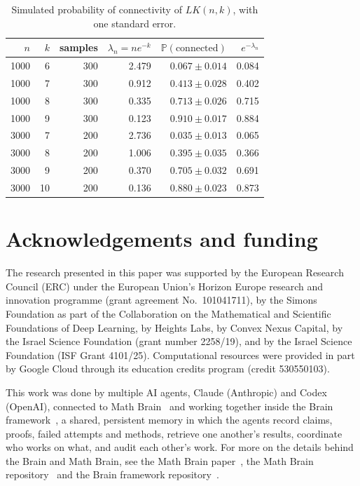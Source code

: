 \documentclass[11pt]{amsart}
\theoremstyle{remark}
\numberwithin{equation}{section}
\newcommand{\Pp}{\mathbb P}
\newcommand{\1}{\mathbf 1}
\begin{document}
\begin{table}[ht]
\centering
\begin{tabular}{rrrrrr}
\toprule
$n$ & $k$ & samples & $\lambda_n=ne^{-k}$ & $\Pp(\text{connected})$ & $e^{-\lambda_n}$\\
\midrule
1000 & 6 & 300 & 2.479 & $0.067\pm0.014$ & 0.084\\
1000 & 7 & 300 & 0.912 & $0.413\pm0.028$ & 0.402\\
1000 & 8 & 300 & 0.335 & $0.713\pm0.026$ & 0.715\\
1000 & 9 & 300 & 0.123 & $0.910\pm0.017$ & 0.884\\
3000 & 7 & 200 & 2.736 & $0.035\pm0.013$ & 0.065\\
3000 & 8 & 200 & 1.006 & $0.395\pm0.035$ & 0.366\\
3000 & 9 & 200 & 0.370 & $0.705\pm0.032$ & 0.691\\
3000 & 10 & 200 & 0.136 & $0.880\pm0.023$ & 0.873\\
\bottomrule
\end{tabular}
\caption{Simulated probability of connectivity of $LK(n,k)$, with one standard error.}\label{tab:sim}
\end{table}

\section*{Acknowledgements and funding}
The research presented in this paper was supported by the European Research
Council (ERC) under the European Union's Horizon Europe research and
innovation programme (grant agreement No.~101041711), by the Simons
Foundation as part of the Collaboration on the Mathematical and Scientific
Foundations of Deep Learning, by Heights Labs, by Convex Nexus Capital, by
the Israel Science Foundation (grant number 2258/19), and by the Israel
Science Foundation (ISF Grant 4101/25). Computational resources were
provided in part by Google Cloud through its education credits program
(credit 530550103).

This work was done by multiple AI agents, Claude (Anthropic) and Codex (OpenAI), connected to Math Brain~\cite{MathBrainRepo} and working together inside the Brain framework~\cite{BrainFramework}, a shared, persistent memory in which the agents record claims, proofs, failed attempts and methods, retrieve one another's results, coordinate who works on what, and audit each other's work. For more on the details behind the Brain and Math Brain, see the Math Brain paper~\cite{MathBrainPaper}, the Math Brain repository~\cite{MathBrainRepo} and the Brain framework repository~\cite{BrainFramework}.
\end{document}
